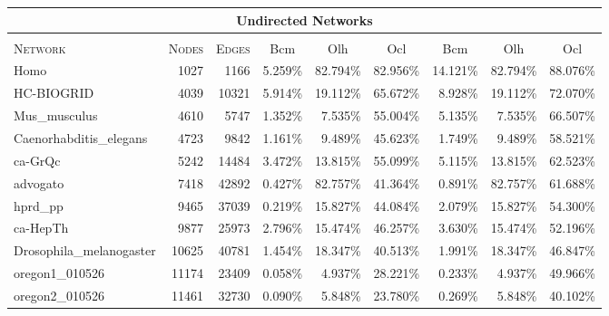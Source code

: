 \documentclass{acm_proc_article-sp}
\newcommand{\deltabfs}{{\sc Olh}}
\newcommand{\sampl}{{\sc Ocl}}
\newcommand{\newalg}{{\sc Bcm}}
\begin{document}
\begin{table*}[tb]
\begin{scriptsize}
\begin{tabular}{|l|r|r|r|r|r|r|r|r|}
\multicolumn{9}{c}{\textbf{Undirected Networks}} \\
\hline
     & &  &  \multicolumn{3}{c|}{} & \multicolumn{3}{c|}{} \\
\textsc{Network} & \textsc{Nodes} & \textsc{Edges} & \multicolumn{1}{c|}{\newalg} & \multicolumn{1}{c|}{\deltabfs} & \multicolumn{1}{c|}{\sampl} & \multicolumn{1}{c|}{\newalg} & \multicolumn{1}{c|}{\deltabfs} & \multicolumn{1}{c|}{\sampl} \\
\hline
Homo                    &     1027     &     1166     &     5.259\%     &     82.794\%     &     82.956\%     &     14.121\%     &     82.794\%     &     88.076\%\\ 
HC-BIOGRID              &     4039     &     10321     &     5.914\%     &     19.112\%     &     65.672\%     &     8.928\%     &     19.112\%     &     72.070\%\\ 
Mus\_musculus            &     4610     &     5747     &     1.352\%     &     7.535\%     &     55.004\%     &     5.135\%     &     7.535\%     &     66.507\%\\ 
Caenorhabditis\_elegans     &     4723     &     9842     &     1.161\%     &     9.489\%     &     45.623\%     &     1.749\%     &     9.489\%     &     58.521\%\\ 
 ca-GrQc                      &     5242     &     14484     &     3.472\%     &     13.815\%     &     55.099\%     &     5.115\%     &     13.815\%     &     62.523\%\\ 
advogato               &     7418     &     42892     &     0.427\%     &     82.757\%     &     41.364\%     &     0.891\%     &     82.757\%     &     61.688\%\\ 
hprd\_pp                 &     9465     &     37039     &     0.219\%     &     15.827\%     &     44.084\%     &     2.079\%     &     15.827\%     &     54.300\%\\ 
 ca-HepTh                    &     9877     &     25973     &     2.796\%     &     15.474\%     &     46.257\%     &     3.630\%     &     15.474\%     &     52.196\%\\ 
 Drosophila\_melanogaster      &     10625     &     40781     &     1.454\%     &     18.347\%     &     40.513\%     &     1.991\%     &     18.347\%     &     46.847\%\\ 
 oregon1\_010526              &     11174     &     23409     &     0.058\%     &     4.937\%     &     28.221\%     &     0.233\%     &     4.937\%     &     49.966\%\\ 
 oregon2\_010526               &     11461     &     32730     &     0.090\%     &     5.848\%     &     23.780\%     &     0.269\%     &     5.848\%     &     40.102\%\\ 

\end{tabular}
\end{scriptsize}
\end{table*}
\end{document}
